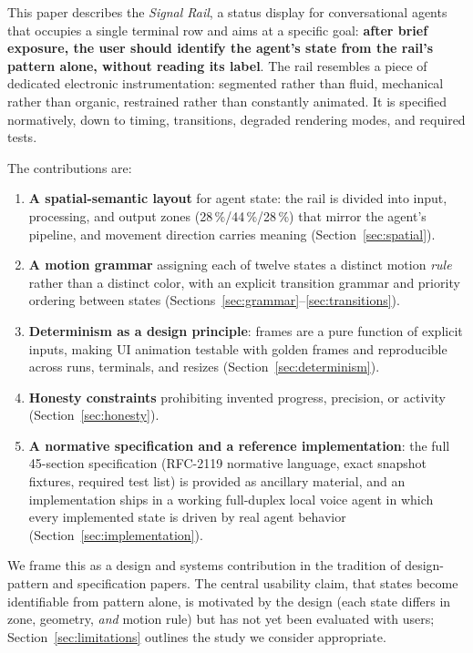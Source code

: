\documentclass[11pt]{article}
\begin{document}
This paper describes the \emph{Signal Rail}, a status display for
conversational agents that occupies a single terminal row and aims at a
specific goal: \textbf{after brief exposure, the user should identify the
agent's state from the rail's pattern alone, without reading its label}.
The rail resembles a piece of dedicated electronic
instrumentation: segmented rather than fluid, mechanical rather than organic, restrained rather than constantly animated. It is specified normatively, down to
timing, transitions, degraded rendering modes, and required tests.

The contributions are:

\begin{enumerate}
\item \textbf{A spatial-semantic layout} for agent state: the rail is
divided into input, processing, and output zones (28\,\%/44\,\%/28\,\%)
that mirror the agent's pipeline, and movement direction carries meaning
(Section~\ref{sec:spatial}).
\item \textbf{A motion grammar} assigning each of twelve states a distinct
motion \emph{rule} rather than a distinct color, with an explicit
transition grammar and priority ordering between states
(Sections~\ref{sec:grammar}--\ref{sec:transitions}).
\item \textbf{Determinism as a design principle}: frames are a pure
function of explicit inputs, making UI animation testable with golden
frames and reproducible across runs, terminals, and resizes
(Section~\ref{sec:determinism}).
\item \textbf{Honesty constraints} prohibiting invented progress,
precision, or activity (Section~\ref{sec:honesty}).
\item \textbf{A normative specification and a reference implementation}:
the full 45-section specification (RFC-2119 normative language, exact
snapshot fixtures, required test list) is provided as ancillary material,
and an implementation ships in a working full-duplex local voice agent in
which every implemented state is driven by real agent behavior
(Section~\ref{sec:implementation}).
\end{enumerate}

We frame this as a design and systems contribution in the
tradition of design-pattern and specification papers. The central
usability claim, that states become identifiable from pattern alone, is
motivated by the design (each state differs in zone, geometry, \emph{and}
motion rule) but has not yet been evaluated with users;
Section~\ref{sec:limitations} outlines the study we consider appropriate.
\end{document}

